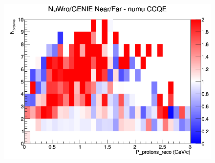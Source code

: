 \begin{figure}[h]
\endminipage
{}
\includegraphics[width=\linewidth]{eff_N_P/GAr/protons/ratios/CCQE_NuWro_GENIE_numu_NF_N_P.png}
\endminipage
\newline
\end{figure}
\clearpage
